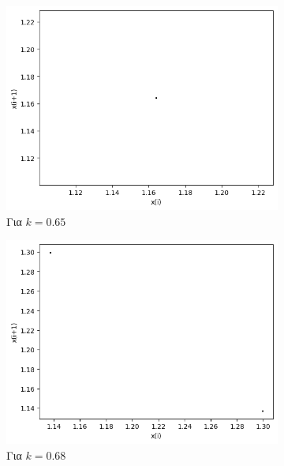 \begin{figure}[ht]
\begin{subfigure}[b]{0.4\textwidth}
		\includegraphics[width=\textwidth]{LateX images/graphs q14/g13}
		\caption{Για $k=0.65$}
		\label{f:k70}
	\end{subfigure}
	\hfill
	\begin{subfigure}[b]{0.4\textwidth}
		\centering
		\includegraphics[width=\textwidth]{LateX images/graphs q14/g14}
		\caption{Για $k=0.68$}
		\label{f:k71}
	\end{subfigure}
	\hfill
	\begin{subfigure}[b]{0.4\textwidth}
		\centering

\end{subfigure}
\end{figure}
